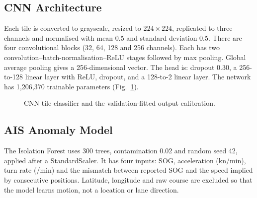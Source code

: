 \documentclass[conference]{IEEEtran}
\begin{document}
\subsection{CNN Architecture}
Each tile is converted to grayscale, resized to $224\times224$, replicated to three
channels and normalised with mean 0.5 and standard deviation 0.5. There are four
convolutional blocks (32, 64, 128 and 256 channels). Each has two
convolution--batch-normalisation--ReLU stages followed by max pooling. Global average
pooling gives a 256-dimensional vector. The head is: dropout 0.30, a 256-to-128 linear
layer with ReLU, dropout, and a 128-to-2 linear layer. The network has 1,206,370
trainable parameters (Fig.~\ref{fig:cnn}).

\begin{figure}[t]
\centering
{}
\caption{CNN tile classifier and the validation-fitted output calibration.}
\label{fig:cnn}
\end{figure}

\subsection{AIS Anomaly Model}
The Isolation Forest uses 300 trees, contamination 0.02 and random seed 42, applied
after a StandardScaler. It has four inputs: SOG, acceleration (kn/min), turn rate
(\textdegree/min) and the mismatch between reported SOG and the speed implied by
consecutive positions. Latitude, longitude and raw course are excluded so that the
model learns motion, not a location or lane direction.
\end{document}
